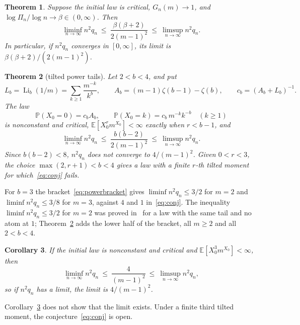 \documentclass[11pt]{amsart}
\newtheorem{theorem}{Theorem}[section]
\newtheorem{corollary}[theorem]{Corollary}
\theoremstyle{remark}
\numberwithin{equation}{section}
\newcommand{\PP}{\mathbb{P}}
\newcommand{\EE}{\mathbb{E}}
\newcommand{\Li}{\operatorname{Li}}
\begin{document}
\begin{theorem}\label{thm:constraint}
Suppose the initial law is critical, $G_n(m)\to1$, and $\log\Pi_n/\log n\to\beta\in(0,\infty)$. Then
\begin{equation}\label{eq:bracket}
\liminf_{n\to\infty}n^2q_n\ \le\ \frac{\beta(\beta+2)}{2(m-1)^2}\ \le\ \limsup_{n\to\infty}n^2q_n .
\end{equation}
In particular, if $n^2q_n$ converges in $[0,\infty]$, its limit is $\beta(\beta+2)/(2(m-1)^2)$.
\end{theorem}

\begin{theorem}[tilted power tails]\label{thm:power}
Let $2<b<4$, and put
\[
L_b=\Li_b(1/m)=\sum_{k\ge1}\frac{m^{-k}}{k^b},\qquad A_b=(m-1)\zeta(b-1)-\zeta(b),\qquad c_b=(A_b+L_b)^{-1}.
\]
The law
\begin{equation}\label{eq:power}
\PP(X_0=0)=c_bA_b,\qquad \PP(X_0=k)=c_b\,m^{-k}k^{-b}\quad(k\ge1)
\end{equation}
is nonconstant and critical, $\EE[X_0^rm^{X_0}]<\infty$ exactly when $r<b-1$, and
\begin{equation}\label{eq:powerbracket}
\liminf_{n\to\infty}n^2q_n\ \le\ \frac{b(b-2)}{2(m-1)^2}\ \le\ \limsup_{n\to\infty}n^2q_n .
\end{equation}
Since $b(b-2)<8$, $n^2q_n$ does not converge to $4/(m-1)^2$. Given $0<r<3$, the choice $\max(2,r+1)<b<4$ gives a law with a finite $r$-th tilted moment for which~\eqref{eq:conj} fails.
\end{theorem}

For $b=3$ the bracket~\eqref{eq:powerbracket} gives $\liminf n^2q_n\le3/2$ for $m=2$ and $\liminf n^2q_n\le3/8$ for $m=3$, against $4$ and $1$ in~\eqref{eq:conj}. The inequality $\liminf n^2q_n\le3/2$ for $m=2$ was proved in~\cite{Sh} for a law with the same tail and no atom at $1$; Theorem~\ref{thm:power} adds the lower half of the bracket, all $m\ge2$ and all $2<b<4$.

\begin{corollary}\label{cor:third}
If the initial law is nonconstant and critical and $\EE[X_0^3m^{X_0}]<\infty$, then
\[
\liminf_{n\to\infty}n^2q_n\ \le\ \frac{4}{(m-1)^2}\ \le\ \limsup_{n\to\infty}n^2q_n ,
\]
so if $n^2q_n$ has a limit, the limit is $4/(m-1)^2$.
\end{corollary}

Corollary~\ref{cor:third} does not show that the limit exists. Under a finite third tilted moment, the conjecture~\eqref{eq:conj} is open.
\end{document}
